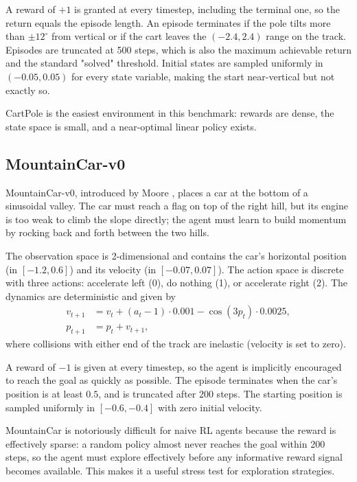 \documentclass{article}
\begin{document}
A reward of $+1$ is granted at every timestep, including the terminal one, so the return equals the episode length. An episode terminates if the pole tilts more than $\pm 12^\circ$ from vertical or if the cart leaves the $(-2.4, 2.4)$ range on the track. Episodes are truncated at 500 steps, which is also the maximum achievable return and the standard "solved" threshold. Initial states are sampled uniformly in $(-0.05, 0.05)$ for every state variable, making the start near-vertical but not exactly so.

CartPole is the easiest environment in this benchmark: rewards are dense, the state space is small, and a near-optimal linear policy exists.

\subsection{MountainCar-v0}
MountainCar-v0, introduced by Moore \citep{moore1990efficient}, places a car at the bottom of a sinusoidal valley. The car must reach a flag on top of the right hill, but its engine is too weak to climb the slope directly; the agent must learn to build momentum by rocking back and forth between the two hills.


The observation space is 2-dimensional and contains the car's horizontal position (in $[-1.2, 0.6]$) and its velocity (in $[-0.07, 0.07]$). The action space is discrete with three actions: accelerate left (0), do nothing (1), or accelerate right (2). The dynamics are deterministic and given by
\begin{align}
v_{t+1} &= v_t + (a_t - 1) \cdot 0.001 - \cos(3 p_t) \cdot 0.0025, \\
p_{t+1} &= p_t + v_{t+1},
\end{align}
where collisions with either end of the track are inelastic (velocity is set to zero).

A reward of $-1$ is given at every timestep, so the agent is implicitly encouraged to reach the goal as quickly as possible. The episode terminates when the car's position is at least $0.5$, and is truncated after 200 steps. The starting position is sampled uniformly in $[-0.6, -0.4]$ with zero initial velocity.

MountainCar is notoriously difficult for naive RL agents because the reward is effectively sparse: a random policy almost never reaches the goal within 200 steps, so the agent must explore effectively before any informative reward signal becomes available. This makes it a useful stress test for exploration strategies.
\end{document}
